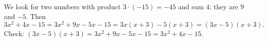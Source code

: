 We look for two numbers with product $3\cdot(-15)=-45$ and sum $4$: they are $9$ and $-5$. Then
\[
3x^2+4x-15=3x^2+9x-5x-15=3x(x+3)-5(x+3)=\boxed{(3x-5)(x+3)}.
\]
Check: $(3x-5)(x+3)=3x^2+9x-5x-15=3x^2+4x-15$.
